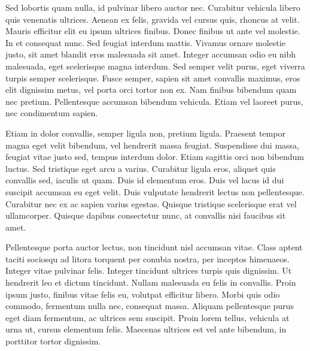 \documentclass[12pt]{article}
\begin{document}
Sed lobortis quam nulla, id pulvinar libero auctor nec. Curabitur vehicula libero quis venenatis ultrices. Aenean ex felis, gravida vel cursus quis, rhoncus at velit. Mauris efficitur elit eu ipsum ultrices finibus. Donec finibus ut ante vel molestie. In et consequat nunc. Sed feugiat interdum mattis. Vivamus ornare molestie justo, sit amet blandit eros malesuada sit amet. Integer accumsan odio eu nibh malesuada, eget scelerisque magna interdum. Sed semper velit purus, eget viverra turpis semper scelerisque. Fusce semper, sapien sit amet convallis maximus, eros elit dignissim metus, vel porta orci tortor non ex. Nam finibus bibendum quam nec pretium. Pellentesque accumsan bibendum vehicula. Etiam vel laoreet purus, nec condimentum sapien.

Etiam in dolor convallis, semper ligula non, pretium ligula. Praesent tempor magna eget velit bibendum, vel hendrerit massa feugiat. Suspendisse dui massa, feugiat vitae justo sed, tempus interdum dolor. Etiam sagittis orci non bibendum luctus. Sed tristique eget arcu a varius. Curabitur ligula eros, aliquet quis convallis sed, iaculis ut quam. Duis id elementum eros. Duis vel lacus id dui suscipit accumsan eu eget velit. Duis vulputate hendrerit lectus non pellentesque. Curabitur nec ex ac sapien varius egestas. Quisque tristique scelerisque erat vel ullamcorper. Quisque dapibus consectetur nunc, at convallis nisi faucibus sit amet.

Pellentesque porta auctor lectus, non tincidunt nisl accumsan vitae. Class aptent taciti sociosqu ad litora torquent per conubia nostra, per inceptos himenaeos. Integer vitae pulvinar felis. Integer tincidunt ultrices turpis quis dignissim. Ut hendrerit leo et dictum tincidunt. Nullam malesuada eu felis in convallis. Proin ipsum justo, finibus vitae felis eu, volutpat efficitur libero. Morbi quis odio commodo, fermentum nulla nec, consequat massa. Aliquam pellentesque purus eget diam fermentum, ac ultrices sem suscipit. Proin lorem tellus, vehicula at urna ut, cursus elementum felis. Maecenas ultrices est vel ante bibendum, in porttitor tortor dignissim.
\end{document}
